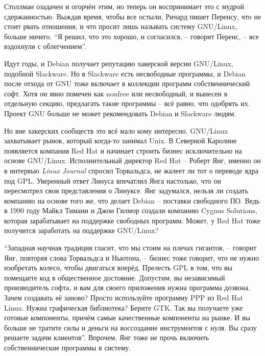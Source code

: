Столлман озадачен и огорчён этим, но теперь он воспринимает это с мудрой сдержанностью. Выждав время, чтобы все остыли, Ричард пишет Перенсу, что не стоит рвать отношения, и что просит лишь называть систему GNU/Linux, больше ничего. \enquote{Я решил, что это хорошо, и согласился, -- говорит Перенс, -- все вздохнули с облегчением}.

Идут годы, и Debian получает репутацию хакерской версии GNU/Linux, подобной Slackware. Но в Slackware есть несвободные программы, и Debian после отхода от GNU тоже включает в коллекции программ собственнический софт. Хотя он явно помечен как nonfree или несвободный, и вынесен в отдельную секцию, предлагать такие программы -- всё равно, что одобрять их. Проект GNU больше не может рекомендовать Debian и Slackware людям.

Но вне хакерских сообществ это всё мало кому интересно. GNU/Linux захватывает рынок, который когда-то занимал Unix. В Северной Каролине появляется компания Red Hat и начинает строить бизнес исключительно на основе GNU/Linux. Исполнительный директор Red Hat -- Роберт Янг, именно он в интервью \textit{Linux Journal} спросил Торвальдса, не жалеет ли тот о переводе ядра под GPL. Уверенный ответ Линуса впечатлил Янга настолько, что он пересмотрел свои представления о Линуксе. Янг задумался, нельзя ли создать компанию на основе того же, что делает Debian -- поставки свободного ПО. Ведь в 1990 году Майкл Тиманн и Джон Гилмор создали компанию Cygnus Solutions, которая зарабатывает на поддержке свободных программ. Может, у Red Hat тоже получится заработать на поддержке GNU/Linux?

\enquote{Западная научная традиция гласит, что мы стоим на плечах гигантов, -- говорит Янг, повторяя слова Торвальдса и Ньютона, -- бизнес тоже говорит, что не нужно изобретать колесо, чтобы двигаться вперёд. Прелесть GPL в том, что вы помещаете код в общественное достояние.  Допустим, вы независимый производитель софта, и вам для своего приложения нужна программа дозвона. Зачем создавать её заново? Просто используйте программу PPP из Red Hat Linux. Нужна графическая библиотека? Берите GTK. Так вы получаете уже готовые компоненты, причём самые качественные компоненты на рынке. И вы больше не тратите силы и деньги на воссоздание инструментов с нуля. Вы сразу решаете задачи клиентов}. Впрочем, Янг тоже не прочь включить собственнические программы в систему.

